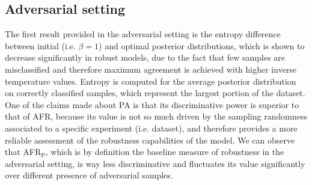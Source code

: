 \newpage

\subsection{Adversarial setting}\label{sec:appendix_results_adversarial}

The first result provided in the adversarial setting is the entropy difference
between initial (i.e. $\beta=1$) and optimal posterior distributions, which is shown
to decrease significantly in robust models, due to the fact that few samples
are misclassified and therefore maximum agreement is achieved with higher
inverse temperature values. Entropy is computed for the average posterior distribution
on correctly classified samples, which represent the largest portion of the dataset. \\

One of the claims made about PA is that its discriminative power is superior to that
of AFR, because its value is not so much driven by the sampling randomness associated
to a specific experiment (i.e. dataset), and therefore provides a more reliable
assessment of the robustness capabilities of the model. We can observe that AFR$_{\text{P}}$,
which is by definition the baseline measure of robustness in the adversarial setting,
is way less discriminative and fluctuates its value significantly over different
presence of adversarial samples.

